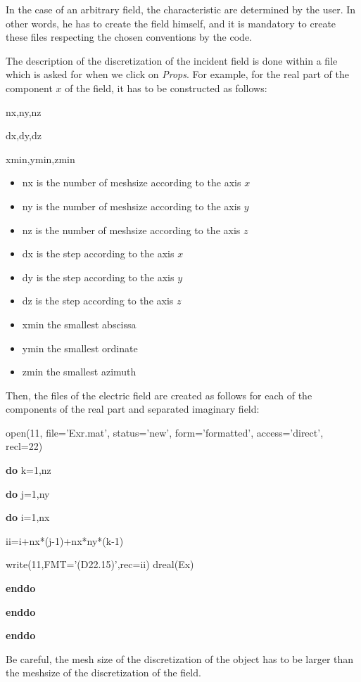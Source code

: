 In the case of an arbitrary field, the characteristic are determined
by the user.  In other words, he has to create the field himself, and
it is mandatory to create these files respecting the chosen
conventions by the code.


The description of the discretization of the incident field is done 
within a file which is asked for when we click on {\it Props}.
For example, for the real part of the component $x$ of the field, 
it has to be constructed as follows:

nx,ny,nz 

dx,dy,dz

xmin,ymin,zmin

\begin{itemize}
\item  nx is the number of meshsize according to the axis $x$
\item  ny is the number of meshsize according to the axis $y$
\item  nz is the number of meshsize according to the axis $z$
\item  dx is the step according to the axis $x$
\item  dy is the step according to the axis $y$
\item  dz is the step according to the axis $z$
\item xmin the smallest abscissa
\item ymin the smallest ordinate
\item zmin the smallest azimuth
\end{itemize}

Then, the files of the electric field are created as follows for 
each of the components of the real part and separated imaginary field:

\vspace{10mm}

open(11, file='Exr.mat', status='new', form='formatted', access='direct', recl=22)

{\bf do} k=1,nz

\hspace{5mm} {\bf do} j=1,ny

\hspace{10mm} {\bf do} i=1,nx 

\hspace{15mm} ii=i+nx*(j-1)+nx*ny*(k-1)

\hspace{15mm} write(11,FMT='(D22.15)',rec=ii) dreal(Ex)

\hspace{10mm} {\bf enddo}

\hspace{5mm} {\bf enddo}

{\bf enddo}

\vspace{10mm}

Be careful, the mesh size of the discretization of the object has to
be larger than the meshsize of the discretization of the field.

